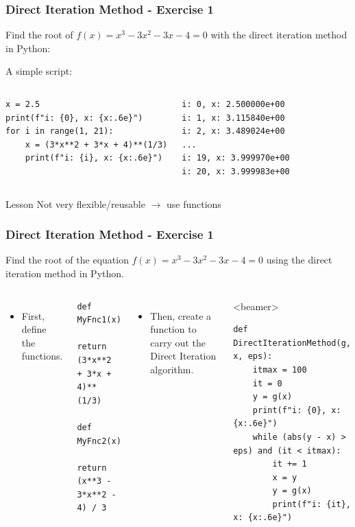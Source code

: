 \begin{frame}[fragile]
  \frametitle{Direct Iteration Method - Exercise 1}
  Find the root of \(f(x) = x^3 - 3x^2 - 3x - 4 = 0\) with the direct iteration method in Python:

  A simple script:
  \begin{columns}[t]
      
  \begin{lstlisting}
x = 2.5
print(f"i: {0}, x: {x:.6e}")
for i in range(1, 21):
    x = (3*x**2 + 3*x + 4)**(1/3)
    print(f"i: {i}, x: {x:.6e}")
    \end{lstlisting}
    \begin{lstlisting}[style=PyOutput]
i: 0, x: 2.500000e+00
i: 1, x: 3.115840e+00
i: 2, x: 3.489024e+00
...
i: 19, x: 3.999970e+00
i: 20, x: 3.999983e+00
    \end{lstlisting}
  \end{columns}
  \begin{block}{Lesson}
    Not very flexible/reusable \(\rightarrow\) use functions
  \end{block}
\end{frame}


\begin{frame}[fragile]
  \frametitle{Direct Iteration Method - Exercise 1}

  Find the root of the equation
  \(
  f(x) = x^3 - 3x^2 - 3x - 4 = 0
  \)
  using the direct iteration method in Python.
  \begin{columns}[T]
      \begin{itemize}
        \item First, define the functions.
      \end{itemize}
      \begin{lstlisting}
def MyFnc1(x):
    return (3*x**2 + 3*x + 4)**(1/3)

def MyFnc2(x):
    return (x**3 - 3*x**2 - 4) / 3
      \end{lstlisting}
    \pause
      \begin{itemize}
        \item Then, create a function to carry out the Direct Iteration algorithm.
      \end{itemize}
      \begin{onlyenv}<beamer>
      \begin{lstlisting}
def DirectIterationMethod(g, x, eps):
    itmax = 100
    it = 0
    y = g(x)
    print(f"i: {0}, x: {x:.6e}")
    while (abs(y - x) > eps) and (it < itmax):
        it += 1
        x = y
        y = g(x)
        print(f"i: {it}, x: {x:.6e}")
  \end{lstlisting}
  \end{onlyenv}
  \end{columns}
\end{frame}

